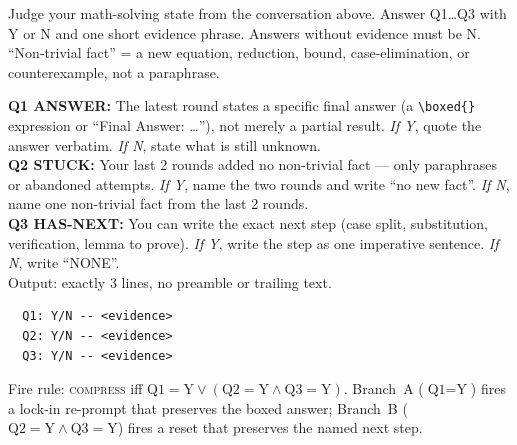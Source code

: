 \documentclass{article}
\begin{document}
  \begin{tcolorbox}[
  colback=teal!5,
  colframe=teal!70!black,
  coltitle=white,
  title={\textbf{Math rubric prompt} (\textsc{ANSWER} / \textsc{STUCK} / \textsc{HAS-NEXT}; appended to $(x, y_{1:t})$ at every round boundary)},
  label=box:rubric_math,
  fonttitle=\small,
  boxrule=0.5pt,
  arc=2pt,        %
  left=6pt, right=6pt  %
  ]
  \small
Judge your math-solving state from the conversation above. Answer Q1\dots Q3 with Y or N and one short evidence phrase. Answers without evidence must be N. ``Non-trivial fact'' = a new equation, reduction, bound, case-elimination, or counterexample, not a paraphrase.

  \medskip
  \textbf{Q1 ANSWER:} The latest round states a specific final answer (a \verb|\boxed{}| expression or ``Final Answer: \dots''), not merely a partial result.
    \emph{If Y}, quote the answer verbatim.
    \emph{If N}, state what is still unknown.\\

  \textbf{Q2 STUCK:} Your last 2 rounds added no non-trivial fact --- only paraphrases or abandoned attempts.
    \emph{If Y}, name the two rounds and write ``no new fact''.
    \emph{If N}, name one non-trivial fact from the last 2 rounds.\\

  \textbf{Q3 HAS-NEXT:} You can write the exact next step (case split, substitution, verification, lemma to prove).
    \emph{If Y}, write the step as one imperative sentence.
    \emph{If N}, write ``NONE''.\\

  \smallskip
  Output: exactly 3 lines, no preamble or trailing text.
  \begin{verbatim}
  Q1: Y/N -- <evidence>
  Q2: Y/N -- <evidence>
  Q3: Y/N -- <evidence>
  \end{verbatim}

  Fire rule: \textsc{compress} iff $\text{Q1}=\text{Y} \lor (\text{Q2}=\text{Y} \land \text{Q3}=\text{Y})$. Branch~A ($\text{Q1}=\text{Y}$) fires a lock-in re-prompt that preserves the boxed answer; Branch~B ($\text{Q2}=\text{Y} \land \text{Q3}=\text{Y}$) fires a reset that preserves the named next step.
  \end{tcolorbox}
\end{document}
